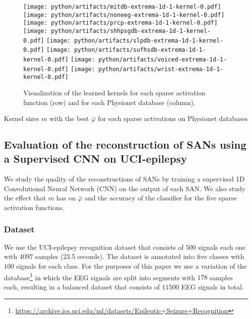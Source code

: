 \documentclass[journal]{IEEEtran}
\begin{document}
\begin{figure*}[!t]
	\texttt{[image: python/artifacts/mitdb-extrema-1d-1-kernel-0.pdf]}
	\texttt{[image: python/artifacts/noneeg-extrema-1d-1-kernel-0.pdf]}
	\texttt{[image: python/artifacts/prcp-extrema-1d-1-kernel-0.pdf]}
	\texttt{[image: python/artifacts/shhpsgdb-extrema-1d-1-kernel-0.pdf]}
	\texttt{[image: python/artifacts/slpdb-extrema-1d-1-kernel-0.pdf]}
	\texttt{[image: python/artifacts/sufhsdb-extrema-1d-1-kernel-0.pdf]}
	\texttt{[image: python/artifacts/voiced-extrema-1d-1-kernel-0.pdf]}
	\texttt{[image: python/artifacts/wrist-extrema-1d-1-kernel-0.pdf]}
	\caption{Visualization of the learned kernels for each sparse activation function (row) and for each Physionet database (column).
	}\label{fig:kernelvisualization}
\end{figure*}

\begin{table*}[!t]
	\centering
	\caption{Kernel sizes $m$ with the best $\bar\varphi$ for each sparse activations on Physionet databases}\label{table:crrl}
	\begin{adjustbox}{width=\textwidth}
		
	\end{adjustbox}
\end{table*}

\subsection{Evaluation of the reconstruction of SANs using a Supervised CNN on UCI-epilepsy}
We study the quality of the reconstructions of SANs by training a supervised 1D Convolutional Neural Network (CNN) on the output of each SAN\@.
We also study the effect that $m$ has on $\bar\varphi$ and the accuracy of the classifier for the five sparse activation functions.

\subsubsection{Dataset}
We use the UCI-epilepsy recognition dataset that consists of $500$ signals each one with $4097$ samples (23.5 seconds).
The dataset is annotated into five classes with $100$ signals for each class.
For the purposes of this paper we use a variation of the database\footnote{\url{https://archive.ics.uci.edu/ml/datasets/Epileptic+Seizure+Recognition}} in which the EEG signals are split into segments with $178$ samples each, resulting in a balanced dataset that consists of $11500$ EEG signals in total.
\end{document}
